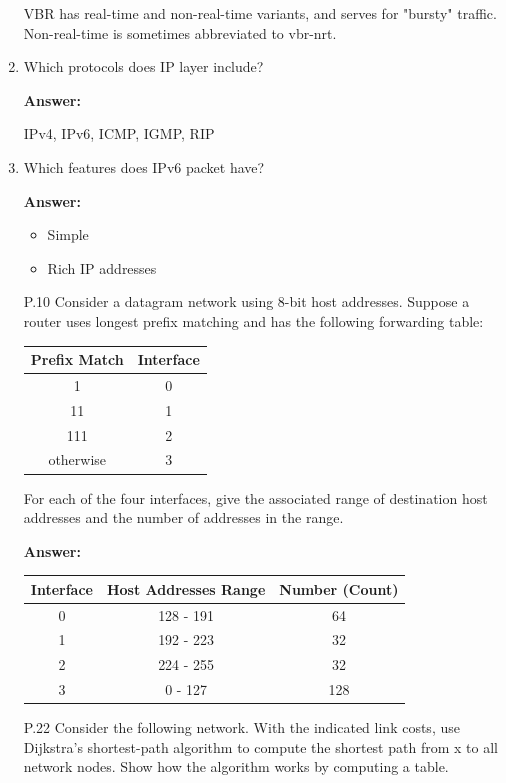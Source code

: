 \begin{enumerate}
    VBR has real-time and non-real-time variants, and serves for "bursty" traffic. Non-real-time is sometimes abbreviated to vbr-nrt.
	
	\item Which protocols does IP layer include?
	
	\textbf{Answer:}
	
	IPv4, IPv6, ICMP, IGMP, RIP
	
	\item Which features does IPv6 packet have?
	
	\textbf{Answer:}
	
	\begin{itemize}
	    \item Simple
	    \item Rich IP addresses
	\end{itemize}
	
	\item[P.10] Consider a datagram network using 8-bit host addresses. Suppose a router uses longest prefix matching and has the following forwarding table:
	
	\begin{tabular}{cc}
	    \hline
	    Prefix Match & Interface \\
	    \hline
	    1 & 0 \\
	    11 & 1 \\
	    111 & 2 \\
	    otherwise & 3 \\
	    \hline
	\end{tabular}
	
	For each of the four interfaces, give the associated range of destination host addresses and the number of addresses in the range.
	
	\textbf{Answer:}
	
	\begin{tabular}{c|cc}
	    Interface & Host Addresses Range & Number (Count) \\
	    \hline
	    0 & 128 - 191 & 64 \\
	    1 & 192 - 223 & 32 \\
	    2 & 224 - 255 & 32\\
	    3 & 0 - 127 & 128 \\
	\end{tabular}
	
	\item[P.22] Consider the following network. With the indicated link costs, use Dijkstra's shortest-path algorithm to compute the shortest path from x to all network nodes. Show how the algorithm works by computing a table.
    

\end{enumerate}
